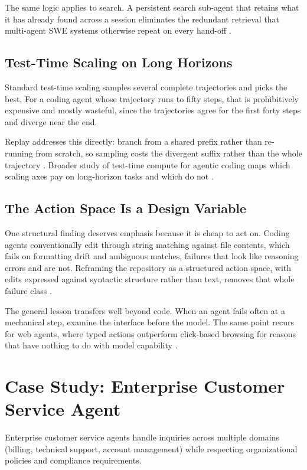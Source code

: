 The same logic applies to search. A persistent search sub-agent that retains what
it has already found across a session eliminates the redundant retrieval that
multi-agent SWE systems otherwise repeat on every hand-off \cite{librarian2026}.

\subsection{Test-Time Scaling on Long Horizons}

Standard test-time scaling samples several complete trajectories and picks the
best. For a coding agent whose trajectory runs to fifty steps, that is
prohibitively expensive and mostly wasteful, since the trajectories agree for the
first forty steps and diverge near the end.

Replay addresses this directly: branch from a shared prefix rather than
re-running from scratch, so sampling costs the divergent suffix rather than the
whole trajectory \cite{swereplay2026}. Broader study of test-time compute for
agentic coding maps which scaling axes pay on long-horizon tasks and which do not
\cite{ttscoding2026}.

\subsection{The Action Space Is a Design Variable}

One structural finding deserves emphasis because it is cheap to act on. Coding
agents conventionally edit through string matching against file contents, which
fails on formatting drift and ambiguous matches, failures that look like
reasoning errors and are not. Reframing the repository as a structured action
space, with edits expressed against syntactic structure rather than text, removes
that whole failure class \cite{codestruct2026}.

The general lesson transfers well beyond code. When an agent fails often at a
mechanical step, examine the interface before the model. The same point recurs for
web agents, where typed actions outperform click-based browsing for reasons that
have nothing to do with model capability \cite{typedactions2026}.

\section{Case Study: Enterprise Customer Service Agent}

Enterprise customer service agents handle inquiries across multiple domains (billing, technical support, account management) while respecting organizational policies and compliance requirements.

